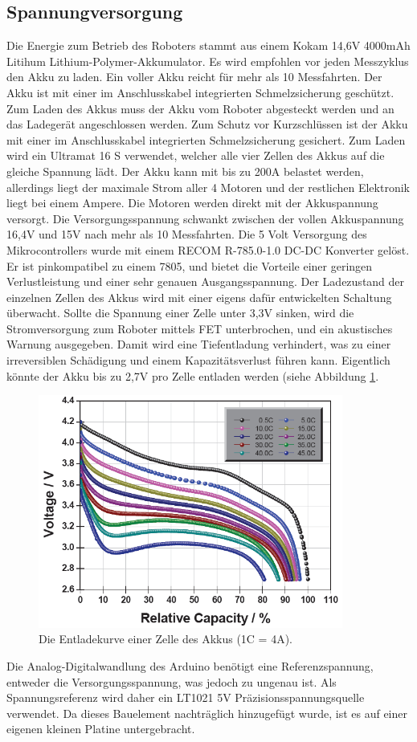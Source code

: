 \documentclass[a4paper,bibtotoc,oneside]{scrbook}
\begin{document}
\subsection{Spannungversorgung}\thispagestyle{empty}
Die Energie zum Betrieb des Roboters stammt aus einem Kokam 14,6V 4000mAh Litihum Lithium-Polymer-Akkumulator. Es wird empfohlen vor jeden Messzyklus den Akku zu laden. Ein voller Akku reicht für mehr als 10 Messfahrten. Der Akku ist mit einer im Anschlusskabel integrierten Schmelzsicherung geschützt. Zum Laden des Akkus muss der Akku vom Roboter abgesteckt werden und an das Ladegerät angeschlossen werden. Zum Schutz vor Kurzschlüssen ist der Akku mit einer im Anschlusskabel integrierten Schmelzsicherung gesichert. Zum Laden wird ein Ultramat 16 S verwendet, welcher alle vier Zellen des Akkus auf die gleiche Spannung lädt. 
Der Akku kann mit bis zu 200A belastet werden, allerdings liegt der maximale Strom aller 4 Motoren und der restlichen Elektronik liegt bei einem Ampere. Die Motoren werden direkt mit der Akkuspannung versorgt. Die Versorgungsspannung schwankt zwischen der vollen Akkuspannung 16,4V und 15V nach mehr als 10 Messfahrten.
Die 5 Volt Versorgung des Mikrocontrollers wurde mit einem RECOM R-785.0-1.0 DC-DC Konverter gelöst. Er ist pinkompatibel zu einem 7805, und bietet die Vorteile einer geringen Verlustleistung und einer sehr genauen Ausgangsspannung. 
Der Ladezustand der einzelnen Zellen des Akkus wird mit einer eigens dafür entwickelten Schaltung überwacht. Sollte die Spannung einer Zelle unter 3,3V sinken, wird die Stromversorgung zum Roboter mittels FET unterbrochen, und ein akustisches Warnung ausgegeben. Damit wird eine Tiefentladung verhindert, was zu einer irreversiblen Schädigung und einem Kapazitätsverlust führen kann. Eigentlich könnte der Akku bis zu 2,7V pro Zelle entladen werden (siehe Abbildung \ref{akku}.
\begin{figure}[htbp]
\centering
\includegraphics[width=100mm]{img/entladekurve.png}
\caption{Die Entladekurve einer Zelle des Akkus (1C = 4A).}\label{akku}
\end{figure} 
Die Analog-Digitalwandlung des Arduino benötigt eine Referenzspannung, entweder die Versorgungsspannung, was jedoch zu ungenau ist. Als Spannungsreferenz wird daher ein LT1021 5V Präzisionsspannungsquelle verwendet. Da dieses Bauelement nachträglich hinzugefügt wurde, ist es auf einer eigenen kleinen Platine untergebracht.
\end{document}
